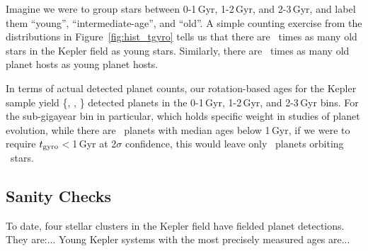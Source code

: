 \documentclass[11pt,twocolumn,tighten]{aastex63}
\begin{document}
%

Imagine we were to group stars between 0-1\,Gyr, 1-2\,Gyr, and
2-3\,Gyr, and label them ``young'', ``intermediate-age'', and ``old''.
A simple counting exercise from the distributions in
Figure~\ref{fig:hist_tgyro} tells us that there are \ratioobtoybstars\
times as many old stars in the Kepler field as young stars.
Similarly, there are \ratioobtoybplanets\ times as many old planet
hosts as young planet hosts. 

In terms of actual detected planet counts, our rotation-based ages for
the Kepler sample yield \{\nplyounggyro, \nplmidgyro, \nploldgyro\}
detected planets in the 0-1\,Gyr, 1-2\,Gyr, and 2-3\,Gyr bins.
For the sub-gigayear bin in particular, which holds specific weight in
studies of planet evolution, while there are \nplyounggyro\ planets
with median ages below 1\,Gyr, if we were to require $t_{\rm
gyro}$$<$1\,Gyr at 2$\sigma$ confidence, this would leave only
\nplyounggyrotwosigma\ planets orbiting \nplhostsyounggyrotwosigma\
stars.

\subsection{Sanity Checks}
To date, four stellar clusters in the Kepler field have fielded planet
detections.
They are:...
Young Kepler systems with the most precisely measured ages are...
\end{document}
